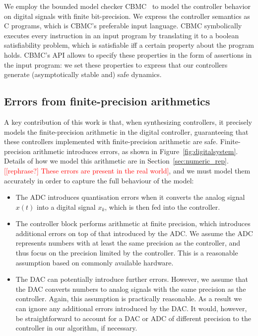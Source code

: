 \documentclass[twocolumn]{autart}    %
\renewcommand{\note}[1]{\textcolor{red}{[#1]}}
\begin{document}
We employ the bounded model checker CBMC~\cite{DBLP:conf/tacas/KroeningT14} to model the controller behavior on digital signals with finite bit-precision.  
We express the controller semantics as C programs, which is CBMC's preferable input language.  
CBMC symbolically executes every instruction in an input program by translating it to a boolean satisfiability problem,
 which is satisfiable iff a certain property about the program holds.  
CBMC's API allows to specify these properties in the form of assertions in the input program: 
we set these properties to express that our controllers generate (asymptotically stable and) safe dynamics. 

\subsection{Errors from finite-precision arithmetics}
\label{sec:errors}

A key contribution of this work is that, when synthesizing controllers, it precisely models the finite-precision arithmetic in the digital controller, guaranteeing that these controllers implemented with finite-precision arithmetic are safe. 
Finite-precision arithmetic introduces errors, as shown in Figure~\ref{fig:digitalsystem}. 
Details of how we model this arithmetic are in Section~\ref{sec:numeric_rep}. 
\note{[rephrase?] These errors are present in the real world}, and we must model them accurately in order to capture the full behaviour of the model:  

\begin{itemize}

\item The ADC introduces quantisation errors when it converts the analog signal $x(t)$ into a digital signal $x_k$, which is then fed into the controller.  

\item The controller block performs arithmetic at finite precision, 
which introduces additional errors on top of that introduced by the ADC. 
We assume the ADC represents numbers with at least the same precision as the controller, 
and thus focus on the precision limited by the controller. 
This is a reasonable assumption based on commonly available hardware. 

\item The DAC can potentially introduce further errors. 
However, we assume that the DAC converts numbers to analog signals with the same precision as the controller. 
Again, this assumption is practically reasonable. 
As a result we can ignore any additional errors introduced by the DAC. 
It would, however, be straightforward to account for a DAC or ADC of different precision to the controller in our algorithm, if necessary. 
\end{itemize}
\end{document}
